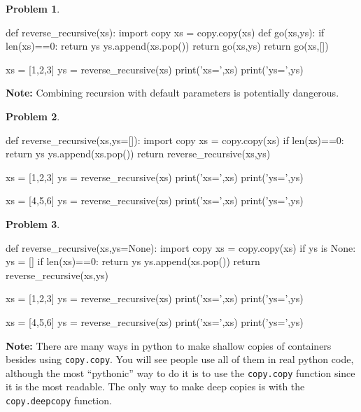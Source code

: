 \documentclass[12pt]{article}
\theoremstyle{definition}
\newtheorem{problem}{Problem}
\begin{document}
{\begin{problem}
~~~
\begin{python}
def reverse_recursive(xs):
    import copy
    xs = copy.copy(xs)
    def go(xs,ys):
        if len(xs)==0:
            return ys
        ys.append(xs.pop())
        return go(xs,ys)
    return go(xs,[])

xs = [1,2,3]
ys = reverse_recursive(xs)
print('xs=',xs)
print('ys=',ys)
\end{python}
\end{problem}
\vspace{2in}

\newpage
\noindent
\textbf{Note:}
Combining recursion with default parameters is potentially dangerous.

\begin{problem}
~~~
\begin{python}
def reverse_recursive(xs,ys=[]):
    import copy
    xs = copy.copy(xs)
    if len(xs)==0:
        return ys
    ys.append(xs.pop())
    return reverse_recursive(xs,ys)

xs = [1,2,3]
ys = reverse_recursive(xs)
print('xs=',xs)
print('ys=',ys)

xs = [4,5,6]
ys = reverse_recursive(xs)
print('xs=',xs)
print('ys=',ys)
\end{python}
\end{problem}
\vspace{2in}

\newpage

\begin{problem}
~~~
\begin{python}
def reverse_recursive(xs,ys=None):
    import copy
    xs = copy.copy(xs)
    if ys is None:
        ys = []
    if len(xs)==0:
        return ys
    ys.append(xs.pop())
    return reverse_recursive(xs,ys)

xs = [1,2,3]
ys = reverse_recursive(xs)
print('xs=',xs)
print('ys=',ys)

xs = [4,5,6]
ys = reverse_recursive(xs)
print('xs=',xs)
print('ys=',ys)
\end{python}
\end{problem}
\vspace{2in}
}


\newpage
\noindent
\textbf{Note:}
There are many ways in python to make shallow copies of containers besides using \texttt{copy.copy}.
You will see people use all of them in real python code,
although the most ``pythonic'' way to do it is to use the \texttt{copy.copy} function since it is the most readable.
The only way to make deep copies is with the \texttt{copy.deepcopy} function.
\end{document}
